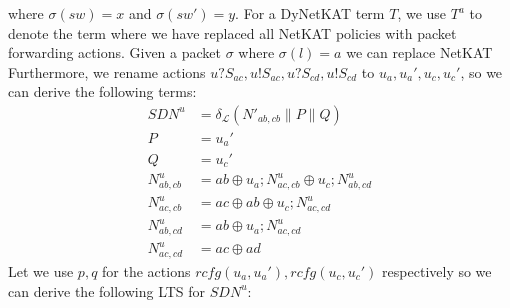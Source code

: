 \begin{example}
    where $\sigma(sw) = x$ and $\sigma(sw') = y$.
    For a DyNetKAT term $T$, we use $T^a$ to denote the term where
    we have replaced all NetKAT policies with packet forwarding actions.
    Given a packet $\sigma$ where $\sigma(l) = a$ we can replace NetKAT
    Furthermore, we rename actions
    $u?S_{ac},u!S_{ac},u?S_{cd},u!S_{cd}$ to $u_a,u_a',u_c,u_c'$,
    so we can derive the following terms:
    \begin{align*}
        SDN^u       & = \delta_{\mathcal{L}}( N'_{ab,cb} \parallel P \parallel Q) \\
        P           & = u_a'                                                      \\
        Q           & = u_c'                                                      \\
        N^u_{ab,cb} & = ab \oplus u_a;N^u_{ac,cb} \oplus u_c;N^u_{ab,cd}          \\
        N^u_{ac,cb} & = ac \oplus ab \oplus u_c;N^u_{ac,cd}                       \\
        N^u_{ab,cd} & = ab \oplus u_a;N^u_{ac,cd}                                 \\
        N^u_{ac,cd} & = ac \oplus ad
    \end{align*}
    Let we use $p,q$ for the actions $rcfg(u_a,u_a'),rcfg(u_c,u_c')$
    respectively so we can derive the following LTS for $SDN^u$:
    \begin{center}
\end{center}
\end{example}

